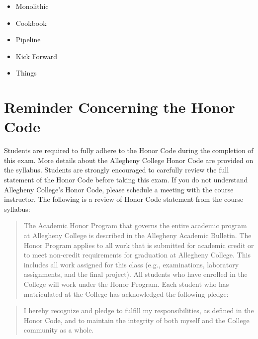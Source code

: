 \documentclass[11pt]{article}
\begin{document}
\begin{itemize}
\begin{itemize}
        \begin{itemize}
          \itemsep 0in
          \item Monolithic
          \item Cookbook
          \item Pipeline
          \item Kick Forward
          \item Things
        \end{itemize}

    \end{itemize}

\end{itemize}

\section*{Reminder Concerning the Honor Code}

\noindent Students are required to fully adhere to the Honor Code during the
completion of this exam. More details about the Allegheny College Honor Code are
provided on the syllabus. Students are strongly encouraged to carefully review
the full statement of the Honor Code before taking this exam. If you do not
understand Allegheny College's Honor Code, please schedule a meeting with the
course instructor. The following is a review of Honor Code statement from the
course syllabus:

\begin{quote}

  The Academic Honor Program that governs the entire academic program at
  Allegheny College is described in the Allegheny Academic Bulletin. The Honor
  Program applies to all work that is submitted for academic credit or to meet
  non-credit requirements for graduation at Allegheny College. This includes all
  work assigned for this class (e.g., examinations, laboratory assignments, and
  the final project). All students who have enrolled in the College will work
  under the Honor Program. Each student who has matriculated at the College has
  acknowledged the following pledge:

\end{quote}

\begin{quote}

  I hereby recognize and pledge to fulfill my responsibilities, as defined in
  the Honor Code, and to maintain the integrity of both myself and the College
  community as a whole.

\end{quote}
\end{document}
